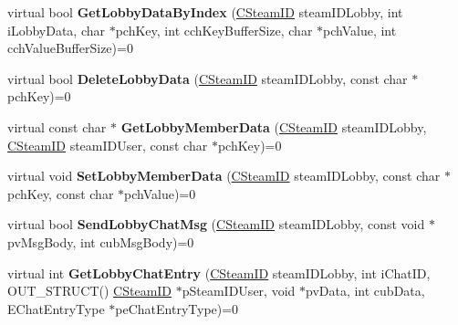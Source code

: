 \begin{DoxyCompactItemize}
\item 
\mbox{\label{class_i_steam_matchmaking_a023c45bec3f3aec3934254440b87b1ed}} 
virtual bool {\bfseries Get\+Lobby\+Data\+By\+Index} (\hyperlink{class_c_steam_i_d}{C\+Steam\+ID} steam\+I\+D\+Lobby, int i\+Lobby\+Data, char $\ast$pch\+Key, int cch\+Key\+Buffer\+Size, char $\ast$pch\+Value, int cch\+Value\+Buffer\+Size)=0
\item 
\mbox{\label{class_i_steam_matchmaking_a1cfc86681d82aee096417445c3c267f9}} 
virtual bool {\bfseries Delete\+Lobby\+Data} (\hyperlink{class_c_steam_i_d}{C\+Steam\+ID} steam\+I\+D\+Lobby, const char $\ast$pch\+Key)=0
\item 
\mbox{\label{class_i_steam_matchmaking_abb257e70af749cd2f0df597bb42a524b}} 
virtual const char $\ast$ {\bfseries Get\+Lobby\+Member\+Data} (\hyperlink{class_c_steam_i_d}{C\+Steam\+ID} steam\+I\+D\+Lobby, \hyperlink{class_c_steam_i_d}{C\+Steam\+ID} steam\+I\+D\+User, const char $\ast$pch\+Key)=0
\item 
\mbox{\label{class_i_steam_matchmaking_ad3c5489202c48de93c220f6ed4a33984}} 
virtual void {\bfseries Set\+Lobby\+Member\+Data} (\hyperlink{class_c_steam_i_d}{C\+Steam\+ID} steam\+I\+D\+Lobby, const char $\ast$pch\+Key, const char $\ast$pch\+Value)=0
\item 
\mbox{\label{class_i_steam_matchmaking_a2313c8f7e00721028a06fc5b02086328}} 
virtual bool {\bfseries Send\+Lobby\+Chat\+Msg} (\hyperlink{class_c_steam_i_d}{C\+Steam\+ID} steam\+I\+D\+Lobby, const void $\ast$pv\+Msg\+Body, int cub\+Msg\+Body)=0
\item 
\mbox{\label{class_i_steam_matchmaking_ac3b95d7676fea362221864d0b351b627}} 
virtual int {\bfseries Get\+Lobby\+Chat\+Entry} (\hyperlink{class_c_steam_i_d}{C\+Steam\+ID} steam\+I\+D\+Lobby, int i\+Chat\+ID, O\+U\+T\+\_\+\+S\+T\+R\+U\+CT() \hyperlink{class_c_steam_i_d}{C\+Steam\+ID} $\ast$p\+Steam\+I\+D\+User, void $\ast$pv\+Data, int cub\+Data, E\+Chat\+Entry\+Type $\ast$pe\+Chat\+Entry\+Type)=0
\item 
\mbox{\label{class_i_steam_matchmaking_ac2a3833252fac7c6104697d0cbf3b55a}} 

\end{DoxyCompactItemize}
